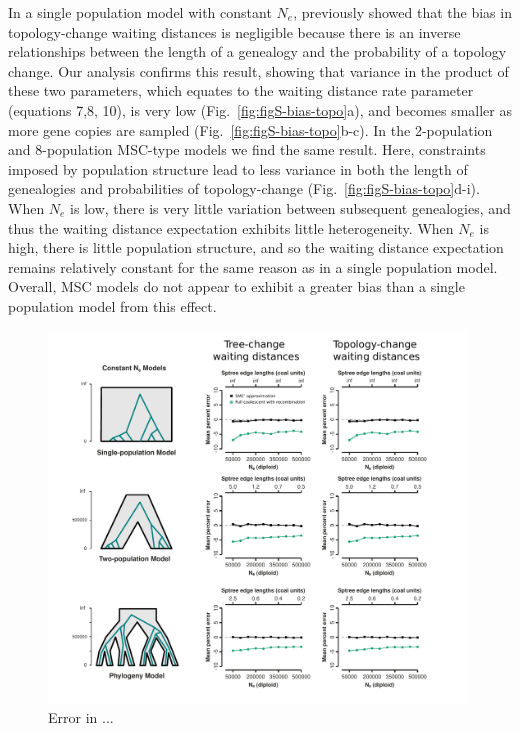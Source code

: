 \documentclass[11pt]{article}
\begin{document}
In a single population model with constant $N_e$, \citet{deng_distribution_2021}
previously showed that the bias in topology-change waiting distances is negligible
because there is an inverse relationships between the length of a genealogy
and the probability of a topology change. Our analysis confirms this result,
showing that variance in the product of these two parameters, 
which equates to the waiting distance rate parameter (equations 7,8, 10), 
is very low (Fig.~\ref{fig:figS-bias-topo}a), and becomes smaller as more 
gene copies are sampled (Fig.~\ref{fig:figS-bias-topo}b-c). In the 2-population
and 8-population MSC-type models we find the same result. Here, constraints 
imposed by population structure lead to less variance in both the 
length of genealogies and probabilities of topology-change
(Fig.~\ref{fig:figS-bias-topo}d-i). When $N_e$ is low, there is very 
little variation between subsequent genealogies, and thus the waiting 
distance expectation exhibits little heterogeneity. When $N_e$ is high,
there is little population structure, and so the waiting distance 
expectation remains relatively constant for the same reason as in a 
single population model. Overall, MSC models do not appear to exhibit a greater
bias than a single population model from this effect.


\begin{figure}[p]
	\centering
	\includegraphics[width=0.99\textwidth]{figures/error-smc-approx.pdf}
	\caption{
		Error in ...
	}
     \label{fig:figS-bias-smc}
\end{figure}
\end{document}
